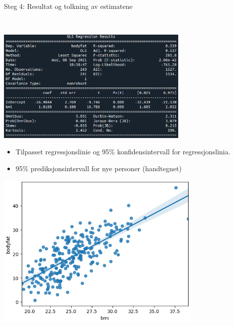 \documentclass[10pt,ignorenonframetext,]{beamer}
\begin{document}
\begin{frame}

\begin{block}{Steg 4: Resultat og tolkning av estimatene}

\(~\)

\includegraphics[width=0.7\textwidth,height=\textheight]{ols_result.png}

\vspace{20mm}

\end{block}

\end{frame}

\begin{frame}

\begin{itemize}
\item
  Tilpasset regressjonslinie og 95\% konfidensintervall for
  regressjonslinia.
\item
  95\% prediksjonsintervall for nye personer (handtegnet)
\end{itemize}

\includegraphics[width=0.75\textwidth,height=\textheight]{ols_result_plot.png}

\end{frame}
\end{document}
